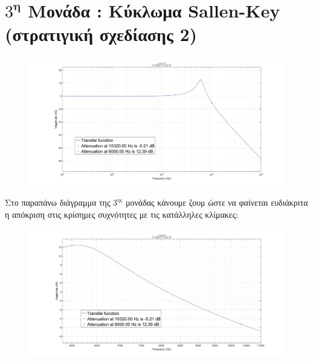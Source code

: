 \documentclass{article}
\begin{document}
{\section*{$3^\textbf{η}$ Μονάδα : Κύκλωμα Sallen-Key \\ (στρατιγική σχεδίασης 2)} 
  \begin{figure}[h!]
\centering
 	\advance\leftskip-4cm
  \includegraphics[width=190mm,scale=2]{t3.jpg}
\end{figure}  
\normalsize{}
Στο παραπάνω διάγραμμα της $3^{ης}$ μονάδας κάνουμε ζουμ ώστε να φαίνεται ευδιάκριτα η απόκριση στις κρίσημες συχνότητες με τις κατάλληλες κλίμακες:
\large{}
 \begin{figure}[h!]
\centering
 	\advance\leftskip-1cm
  \includegraphics[width=120mm,scale=2]{z3.jpg}
\end{figure}
\newpage
}
\end{document}
